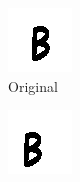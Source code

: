 \documentclass{article}
\begin{document}
\begin{figure}
\begin{subfigure}{0.15\textwidth}
  \centering
  \includegraphics[width=\linewidth]{images/original}
  \caption{Original}
\end{subfigure}
\begin{subfigure}{0.15\textwidth}
  \centering
  \includegraphics[width=\linewidth]{images/translated}

\end{subfigure}
\end{figure}
\end{document}
